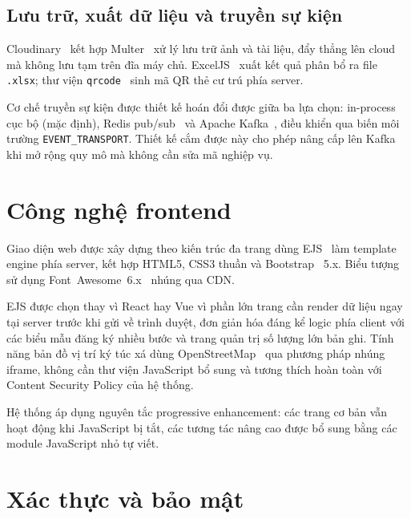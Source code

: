 \documentclass[../DoAn.tex]{subfiles}
\begin{document}
\subsection*{Lưu trữ, xuất dữ liệu và truyền sự kiện}

Cloudinary~\cite{cloudinary_docs} kết hợp Multer~\cite{multer_docs} xử lý lưu
trữ ảnh và tài liệu, đẩy thẳng lên cloud mà không lưu tạm trên đĩa máy chủ.
ExcelJS~\cite{exceljs_docs} xuất kết quả phân bổ ra file \texttt{.xlsx};
thư viện \texttt{qrcode}~\cite{qrcode_docs} sinh mã QR thẻ cư trú phía server.

Cơ chế truyền sự kiện được thiết kế hoán đổi được giữa ba lựa chọn:
in-process cục bộ (mặc định), Redis pub/sub~\cite{redis2024pubsub} và Apache
Kafka~\cite{kafka_docs}, điều khiển qua biến môi trường
\texttt{EVENT\_TRANSPORT}. Thiết kế cắm được này cho phép nâng cấp lên Kafka
khi mở rộng quy mô mà không cần sửa mã nghiệp vụ.

\section{Công nghệ frontend}
\label{sec:frontend}

Giao diện web được xây dựng theo kiến trúc đa trang dùng EJS~\cite{ejs_docs}
làm template engine phía server, kết hợp HTML5, CSS3 thuần và
Bootstrap~\cite{bootstrap_docs} 5.x. Biểu tượng sử dụng Font~Awesome~6.x~\cite{fontawesome_docs}
nhúng qua CDN.

EJS được chọn thay vì React hay Vue vì phần lớn trang cần render dữ liệu ngay
tại server trước khi gửi về trình duyệt, đơn giản hóa đáng kể logic phía
client với các biểu mẫu đăng ký nhiều bước và trang quản trị số lượng lớn bản
ghi. Tính năng bản đồ vị trí ký túc xá dùng OpenStreetMap~\cite{openstreetmap_docs}
qua phương pháp nhúng iframe, không cần thư viện JavaScript bổ sung và tương
thích hoàn toàn với Content Security Policy của hệ thống.

Hệ thống áp dụng nguyên tắc progressive enhancement: các trang cơ bản vẫn hoạt
động khi JavaScript bị tắt, các tương tác nâng cao được bổ sung bằng các
module JavaScript nhỏ tự viết.

\section{Xác thực và bảo mật}
\label{sec:security}
\end{document}
